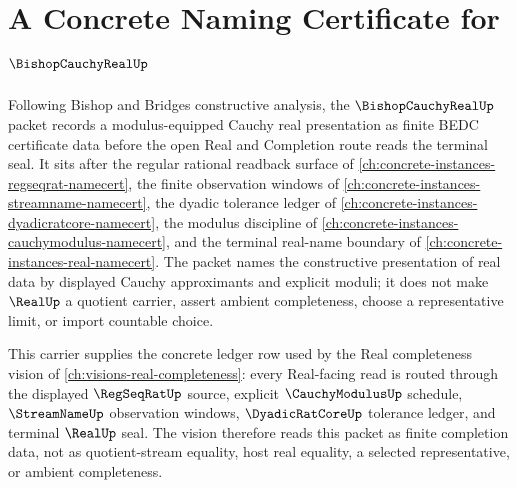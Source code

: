 \chapter{A Concrete Naming Certificate for $\BishopCauchyRealUp$}
\label{ch:concrete-instances-bishopcauchyreal-namecert}

Following Bishop and Bridges constructive analysis, the $\BishopCauchyRealUp$ packet records a modulus-equipped Cauchy real presentation as finite BEDC certificate data before the open Real and Completion route reads the terminal seal. It sits after the regular rational readback surface of \autoref{ch:concrete-instances-regseqrat-namecert}, the finite observation windows of \autoref{ch:concrete-instances-streamname-namecert}, the dyadic tolerance ledger of \autoref{ch:concrete-instances-dyadicratcore-namecert}, the modulus discipline of \autoref{ch:concrete-instances-cauchymodulus-namecert}, and the terminal real-name boundary of \autoref{ch:concrete-instances-real-namecert}. The packet names the constructive presentation of real data by displayed Cauchy approximants and explicit moduli; it does not make $\RealUp$ a quotient carrier, assert ambient completeness, choose a representative limit, or import countable choice.

This carrier supplies the concrete ledger row used by the Real completeness vision of \autoref{ch:visions-real-completeness}: every Real-facing read is routed through the displayed $\RegSeqRatUp$ source, explicit $\CauchyModulusUp$ schedule, $\StreamNameUp$ observation windows, $\DyadicRatCoreUp$ tolerance ledger, and terminal $\RealUp$ seal. The vision therefore reads this packet as finite completion data, not as quotient-stream equality, host real equality, a selected representative, or ambient completeness.

